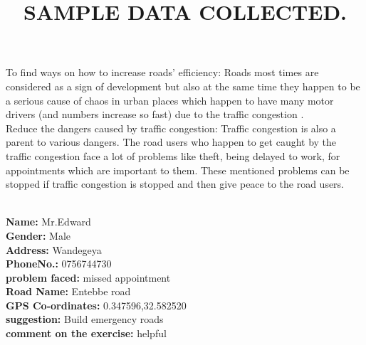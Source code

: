 \documentclass[11pt]{article}
\begin{document}
To find ways on how to increase roads’ efficiency: Roads most times are considered as a sign of development but also at the same time they happen to be a serious cause of chaos in urban places which happen to have many motor drivers (and numbers increase so fast) due to the traffic congestion .\\

Reduce the dangers caused by traffic congestion: Traffic congestion is also a parent to various dangers. The road users who happen to get caught by the traffic congestion face a lot of problems like theft, being delayed to work, for appointments which are important to them. These mentioned problems can be stopped if traffic congestion is stopped and then give peace to the road users. 

\title{\textbf{SAMPLE DATA COLLECTED.}}\\
\textbf{Name:} Mr.Edward \\\textbf{Gender:} Male \\\textbf{Address:} Wandegeya\\ \textbf{PhoneNo.:} 0756744730\\ \textbf{problem faced:} missed appointment\\\textbf{Road Name:} Entebbe road\\\textbf{GPS Co-ordinates:}‎ 0.347596,‎32.582520\\\textbf{suggestion:} Build emergency roads\\\textbf{comment on the exercise:} helpful\\
\end{document}
